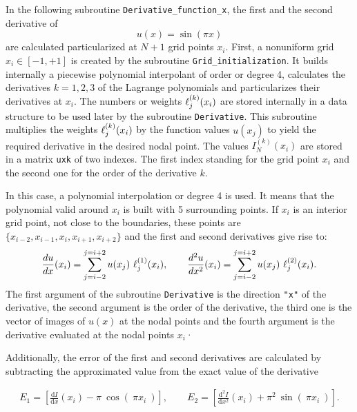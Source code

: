   
  In the following subroutine \verb|Derivative_function_x|, the first and the second derivative of 
  \begin{equation*}
    u(x) = \sin(\pi x) 
   \end{equation*}
  are calculated particularized at $ N+1 $ grid points $ x_i $. First, a nonuniform grid $ x_i \in  [-1, +1]$ is created by the subroutine \verb|Grid_initialization|. It builds internally a piecewise polynomial interpolant of order or degree 4, calculates the derivatives $ k=1, 2, 3 $  of the Lagrange polynomials and particularizes their derivatives at $ x_i $. The numbers or weights  $ \ell^{(k)}_j(x_i) $ are stored internally in a data structure to be used later by the subroutine \verb|Derivative|. This subroutine multiplies the  weights $ \ell^{(k)}_j(x_i) $ by the function values $ u(x_j) $ to yield the required derivative in the desired nodal point. 
  The values $ I_N ^{(k)}(x_i) $ are stored in a matrix \verb|uxk| of two indexes. The first index standing for the grid point $ x_i $ and the second one for the order of the derivative $ k $.  
  
  In this case, a polynomial interpolation or degree 4 is used. It means that the polynomial valid around $ x_i $ is built with 5 surrounding points.
  If  $ x_i $ is an interior grid point,  not close to the boundaries, these points are $ \{x_{i-2},x_{i-1},x_{i},x_{i+1},x_{i+2}\}$ and the first and second derivatives give rise to: 
  \begin{align*}
    \frac{du } { dx } (x_i) = \sum _{j=i-2} ^{j=i+2} u(x_j) \ \lagrange^{(1)}_j(x_i),  \qquad 
      \frac{d^2u } { dx^2 } (x_i) = \sum _{j=i-2} ^{j=i+2} u(x_j) \ \lagrange^{(2)}_j(x_i). 
   \end{align*}
   The first argument of the subroutine \verb|Derivative| is the direction \verb|"x"| of the derivative, the second argument is the order of the derivative, the third one is the vector of images of $ u(x) $ at the nodal points and  the fourth argument is the derivative evaluated at the nodal points $ x_i$·
  
  
  Additionally, the error of the first and second derivatives are calculated by subtracting  the approximated value from the exact value of the derivative
 
  \begin{align*}
    E_1 = \left[ \frac{\text{d} I}{\text{d} x }(x_i)  - \pi \ \cos(\ \pi x_i\ ) \right],    \qquad
    E_2 = \left[ \frac{\text{d}^2 I}{\text{d} x ^2}(x_i)  + \pi^2 \  \sin(\ \pi x_i\ ) \right].
  \end{align*}
  
